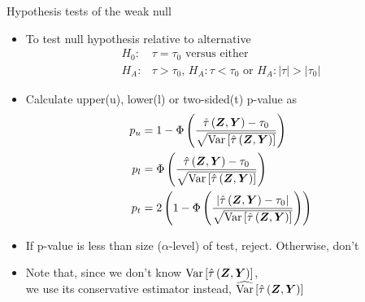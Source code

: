 \documentclass[table, xcolor = {dvipsnames}, 9pt]{beamer}
\theoremstyle{plain}
\DeclareMathOperator{\Var}{\rm{Var}}
\begin{document}
\begin{frame}{Hypothesis tests of the weak null} \vfill
\begin{itemize} \vfill
\item To test null hypothesis relative to alternative \vfill
\begin{align*}
H_0: & \tau = \tau_0 \text{ versus either } \\
H_A: & \tau > \tau_0, \, H_A: \tau < \tau_0 \text{ or } H_A: \left\lvert \tau \right\rvert > \left\lvert \tau_0 \right \rvert
\end{align*} \vfill
\item Calculate upper(u), lower(l) or two-sided(t) p-value as \vfill
\begin{align*}
p_u & =  1 - \Phi\left(\frac{\hat{\tau}\left(\bm{Z}, \bm{Y}\right) - \tau_0}{\sqrt{\Var\left[\hat{\tau}\left(\bm{Z}, \bm{Y}\right)\right]}}\right) \\
p_l & =  \Phi\left(\frac{\hat{\tau}\left(\bm{Z}, \bm{Y}\right) - \tau_0}{\sqrt{\Var\left[\hat{\tau}\left(\bm{Z}, \bm{Y}\right)\right]}}\right) \\
p_t & = 2\left(1 - \Phi\left(\frac{\left\lvert\hat{\tau}\left(\bm{Z}, \bm{Y}\right) - \tau_0\right\rvert}{\sqrt{\Var\left[\hat{\tau}\left(\bm{Z}, \bm{Y}\right)\right]}}\right)\right)
\end{align*} \vfill
\item If p-value is less than size ($\alpha$-level) of test, reject. Otherwise, don't \vfill
\item Note that, since we don't know $\Var\left[\hat{\tau}\left(\bm{Z}, \bm{Y}\right)\right]$, \\ we use its conservative estimator instead, $\widehat{\Var}\left[\hat{\tau}\left(\bm{Z}, \bm{Y}\right)\right]$ \vfill
\end{itemize} \vfill
\end{frame}
\end{document}
